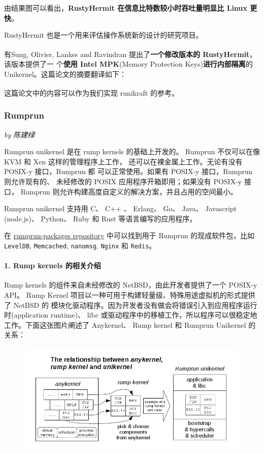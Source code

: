 \documentclass[UTF8,fontset=none,linespread=1.15]{ctexart}
\let\nosupcite\cite
\renewcommand*{\cite}[1]{\textsuperscript{\nosupcite{#1}}}
\newcommand{\sectionauthor}[1]{%
\vspace*{-5ex}
\noindent\textrm{\hfill\textit{by #1}}
\vspace*{2ex}\par}
\begin{document}
由结果图可以看出，\textbf{RustyHermit 在信息比特数较小时吞吐量明显比 Linux 更快}。

RustyHermit 也是一个用来评估操作系统新的设计的研究项目。


有Sung, Olivier, Lankes and Ravindran\cite{bib:18-intra-unikernel}
提出了\textbf{一个修改版本的 RustyHermit}，该版本提供了一
个\textbf{使用 Intel MPK}(Memory Protection Keys)\textbf{进行内部隔离}的
Unikernel。这篇论文的摘要翻译如下：

这篇论文中的内容可以作为我们实现 runikraft 的参考。\cite{bib:19-mpk}

\subsubsection{Rumprun}\sectionauthor{陈建绿}

Rumprun unikernel 是在 rump kernels 的基础上开发的。
Rumprun 不仅可以在像 KVM 和 Xen 这样的管理程序上工作，
还可以在裸金属上工作。无论有没有 POSIX-y 接口，Rumprun 都
可以正常使用。如果有 POSIX-y 接口，Rumprun 则允许现有的、
未经修改的 POSIX 应用程序开箱即用；如果没有 POSIX-y 接口，
Rumprun 则允许构建高度自定义的解决方案，并且占用的空间最小。

Rumprun unikernel 支持用 C、 C++ 、 Erlang、 Go、
Java、 Javascript (node.js)、 Python、 Ruby 和 Rust 等语言编写的应用程序。

在 \href{https://github.com/rumpkernel/rumprun-packages}{rumprun-packages repository}
中可以找到用于 Rumprun 的现成软件包，比如 \texttt{LevelDB},
\texttt{Memcached}, \texttt{nanomsg}, \texttt{Nginx} 和 \texttt{Redis}。

\paragraph{1. Rump kernels 的相关介绍}\cite{bib:21-rump-kernel}\cite{bib:22-xen}



Rump kernels 的组件来自未经修改的 NetBSD，由此开发者提供了一个 POSIX-y API。
Rump Kernel 项目以一种可用于构建轻量级、特殊用途虚拟机的形式提供了 NetBSD 的
模块化驱动程序。因为开发者没有做会将错误引入到应用程序运行时(application runtime)、
libc 或驱动程序中的移植工作，所以程序可以很稳定地工作。下面这张图片阐述了 Anykernel、
Rump kernel 和 Rumprun Unikernel 的关系：
\begin{figure}[H]
\includegraphics[width=\linewidth]{pictures/rumprun-1.png}
\caption{}
\end{figure}
\end{document}

